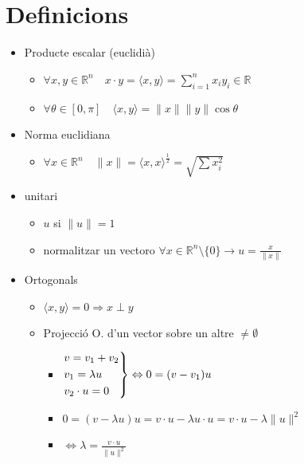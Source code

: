 \documentclass{article}
\newcommand{\R}{\mathbb{R}}
\newcommand{\prodEscalar}[2]{\langle#1, #2\rangle}
\begin{document}
\section{Definicions}
\begin{itemize}
\item Producte escalar (euclidià)
\begin{itemize}
	\item $ \forall x, y \in \R^n\quad x\cdot y = \prodEscalar{x}{y} = \sum_{i=1}^n x_iy_i \in \R$
	\item $ \forall \theta \in [0, \pi] \quad \prodEscalar{x}{y} = \|x\|\|y\| \cos{\theta}$
\end{itemize}
\item Norma euclidiana
	\begin{itemize}
	\item $\forall x \in \R^n \quad \|x\| = \prodEscalar{x}{x}^{\frac{1}{2}} = \sqrt{\sum x_i^2}$
	\end{itemize}
\item unitari
	\begin{itemize}
	\item $u$ si $\|u\| = 1$
	\item normalitzar un vectoro
		\subitem $\forall x \in \R^n\setminus \{0\} \to u = \frac{x}{\|x\|}$
	\end{itemize}

\item Ortogonals
	\begin{itemize}
	\item $\prodEscalar{x}{y} = 0 \Rightarrow x \perp y$
	\item Projecció O. d'un vector sobre un altre $\neq \emptyset$
		\begin{itemize}
		\item
		$
		\begin{rcases}
		v = v_1 + v_2\\ v_1 = \lambda u \\ v_2 \cdot u = 0
		\end{rcases} \Leftrightarrow 0 = (v - v_1)u 
		$
		\item $0 = (v - \lambda u) u = v\cdot u - \lambda u\cdot u = v\cdot u - \lambda \|u\|^2$
		\item $\Leftrightarrow \lambda = \frac{v\cdot u}{\|u\|^2}$
		\end{itemize}
	\end{itemize}
\end{itemize}
\end{document}
